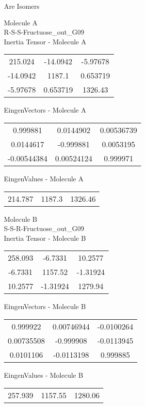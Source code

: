 \begin{center}
\vtab
\vtab
\textcolor{NavyBlue}{\Large Are Isomers}
\end{center}
\newpage
\begin{multicols}{2}
\begin{center}
Molecule A \\ 
R-S-S-Fructuose\_out\_G09
\\
Inertia Tensor - Molecule A \\
\vtab
\begin{tabular}{|c c c|}
215.024	 & 	-14.0942	 & 	-5.97678	 \\
-14.0942	 & 	1187.1	 & 	0.653719	 \\
-5.97678	 & 	0.653719	 & 	1326.43
\end{tabular}

\vtab
 EingenVectors - Molecule A     \\
\vtab
\begin{tabular}{|c c c|}
0.999881	 & 	0.0144902	 & 	0.00536739	 \\
0.0144617	 & 	-0.999881	 & 	0.0053195	 \\
-0.00544384	 & 	0.00524124	 & 	0.999971
\end{tabular}

\vtab
 EingenValues - Molecule A     \\
\vtab
\begin{tabular}{|c c c|}
214.787	 & 	1187.3	 & 	1326.46
\end{tabular}
\columnbreak

Molecule B \\ 
S-S-R-Fructuose\_out\_G09
\\
Inertia Tensor - Molecule B \\
\vtab
\begin{tabular}{|c c c|}
258.093	 & 	-6.7331	 & 	10.2577	 \\
-6.7331	 & 	1157.52	 & 	-1.31924	 \\
10.2577	 & 	-1.31924	 & 	1279.94
\end{tabular}

\vtab
 EingenVectors - Molecule B     \\
\vtab
\begin{tabular}{|c c c|}
0.999922	 & 	0.00746944	 & 	-0.0100264	 \\
0.00735508	 & 	-0.999908	 & 	-0.0113945	 \\
0.0101106	 & 	-0.0113198	 & 	0.999885
\end{tabular}

\vtab
 EingenValues - Molecule B     \\
\vtab
\begin{tabular}{|c c c|}
257.939	 & 	1157.55	 & 	1280.06
\end{tabular}

\end{center}
\end{multicols}
